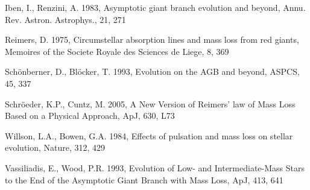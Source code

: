 \documentclass[a4paper,11pt,twocolumn]{article}
\begin{document}
\begin{thebibliography}{9}
    Iben, I., Renzini, A. 1983, Asymptotic giant branch evolution and beyond, Annu. Rev. Astron. Astrophys., 21, 271

    Reimers, D. 1975, Circumstellar absorption lines and mass loss from red giants, Memoires of the Societe Royale des Sciences de Liege, 8, 369
    
    Schönberner, D., Blöcker, T. 1993, Evolution on the AGB and beyond, ASPCS, 45, 337


    Schröeder, K.P., Cuntz, M. 2005, A New Version of Reimers’ law of Mass Loss Based on a Physical Approach, ApJ, 630, L73


    Willson, L.A., Bowen, G.A. 1984, Effects of pulsation and mass loss on stellar evolution, Nature, 312, 429



    Vassiliadis, E., Wood, P.R. 1993, Evolution of Low- and Intermediate-Mass Stars to the End of the Asymptotic Giant Branch with Mass Loss, ApJ, 413, 641


\end{thebibliography}
\end{document}
